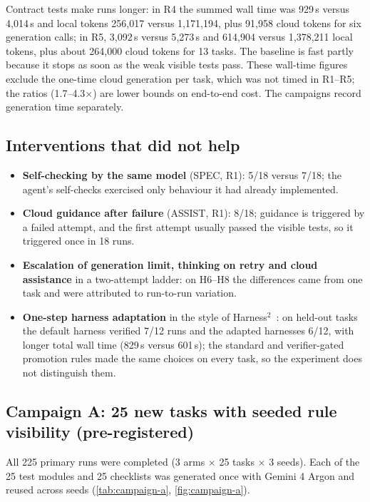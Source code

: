 \documentclass[11pt]{article}
\begin{document}
Contract tests make runs longer: in R4 the summed wall time was 929\,s versus 4{,}014\,s and local tokens 256{,}017 versus 1{,}171{,}194, plus 91{,}958 cloud tokens for six generation calls; in R5, 3{,}092\,s versus 5{,}273\,s and 614{,}904 versus 1{,}378{,}211 local tokens, plus about 264{,}000 cloud tokens for 13 tasks. The baseline is fast partly because it stops as soon as the weak visible tests pass. These wall-time figures exclude the one-time cloud generation per task, which was not timed in R1--R5; the ratios (1.7--4.3$\times$) are lower bounds on end-to-end cost. The campaigns record generation time separately.

\subsection{Interventions that did not help}\label{sec:res-negative}
\begin{itemize}
\item \textbf{Self-checking by the same model} (SPEC, R1): 5/18 versus 7/18; the agent's self-checks exercised only behaviour it had already implemented.
\item \textbf{Cloud guidance after failure} (ASSIST, R1): 8/18; guidance is triggered by a failed attempt, and the first attempt usually passed the visible tests, so it triggered once in 18 runs.
\item \textbf{Escalation of generation limit, thinking on retry and cloud assistance} in a two-attempt ladder: on H6--H8 the differences came from one task and were attributed to run-to-run variation.
\item \textbf{One-step harness adaptation} in the style of Harness$^2$~\citep{harness2}: on held-out tasks the default harness verified 7/12 runs and the adapted harnesses 6/12, with longer total wall time (829\,s versus 601\,s); the standard and verifier-gated promotion rules made the same choices on every task, so the experiment does not distinguish them.
\end{itemize}

\subsection{Campaign A: 25 new tasks with seeded rule visibility (pre-registered)}\label{sec:res-a}
All 225 primary runs were completed (3 arms $\times$ 25 tasks $\times$ 3 seeds). Each of the 25 test modules and 25 checklists was generated once with Gemini 4 Argon and reused across seeds (\cref{tab:campaign-a}, \cref{fig:campaign-a}).
\end{document}
